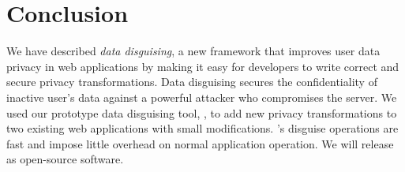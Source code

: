 \section{Conclusion}
\label{s:concl}

%
We have described \emph{data disguising}, a new framework that improves user
data privacy in web applications by making it easy for developers to write
correct and secure privacy transformations.
%
Data disguising secures the confidentiality of inactive user's data against
a powerful attacker who compromises the server.
%
We used our prototype data disguising tool, \sys, to add new privacy
transformations to two existing web applications with small modifications.
%
\sys's disguise operations are fast and impose little overhead on normal
application operation.
%
We will release \sys as open-source software.
%
